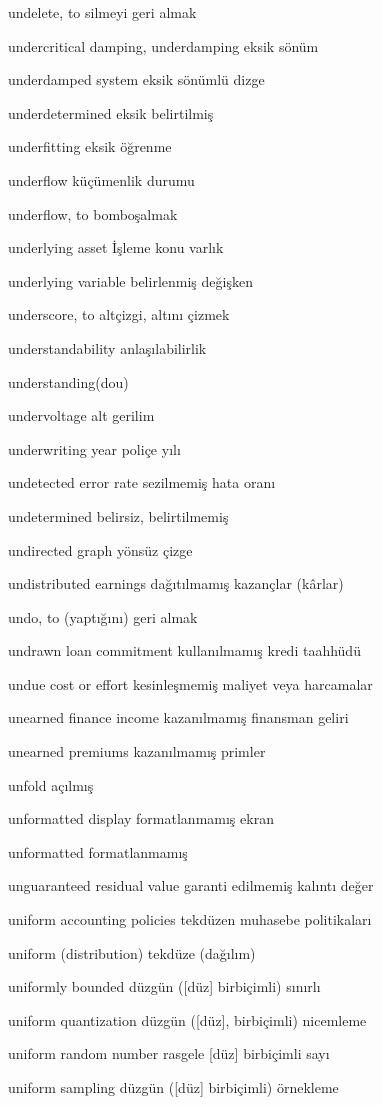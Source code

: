 \documentclass[12pt,fleqn]{article}\usepackage{../../common}
\begin{document}
undelete, to silmeyi geri almak

undercritical damping, underdamping eksik sönüm

underdamped system eksik sönümlü dizge

underdetermined eksik belirtilmiş

underfitting eksik öğrenme

underflow küçümenlik durumu

underflow, to bomboşalmak

underlying asset İşleme konu varlık

underlying variable belirlenmiş değişken

underscore, to altçizgi, altını çizmek

understandability anlaşılabilirlik

understanding(dou)

undervoltage alt gerilim

underwriting year poliçe yılı

undetected error rate sezilmemiş hata oranı

undetermined belirsiz, belirtilmemiş

undirected graph yönsüz çizge

undistributed earnings dağıtılmamış kazançlar (kârlar)

undo, to (yaptığını) geri almak

undrawn loan commitment kullanılmamış kredi taahhüdü

undue cost or effort kesinleşmemiş maliyet veya harcamalar

unearned finance income kazanılmamış finansman geliri

unearned premiums kazanılmamış primler

unfold açılmış

unformatted display formatlanmamış ekran

unformatted formatlanmamış

unguaranteed residual value garanti edilmemiş kalıntı değer

uniform accounting policies tekdüzen muhasebe politikaları

uniform (distribution) tekdüze (dağılım)

uniformly bounded düzgün ([düz] birbiçimli) sınırlı

uniform quantization düzgün ([düz], birbiçimli) nicemleme 

uniform random number rasgele [düz] birbiçimli sayı

uniform sampling düzgün ([düz] birbiçimli) örnekleme
\end{document}
